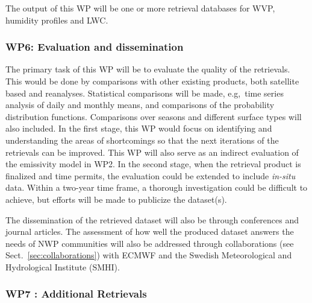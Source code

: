 \documentclass[12pt,oneside,a4paper]{article}
\begin{document}
The output of this WP will be one or more retrieval databases for WVP, humidity profiles and LWC.
\vspace{-1.0ex}
\subsubsection*{WP6: Evaluation and dissemination}
%
\label{sec:evaluation}
The primary task of this WP will be to evaluate the quality of the retrievals.  This would be done by comparisons with other existing products, both satellite based and reanalyses. Statistical comparisons will be made, e.g,\, time series analysis of daily and monthly means, and comparisons of the probability
distribution functions. Comparisons over seasons and different surface types will also included. In the first stage, this WP would focus on identifying and understanding the areas of shortcomings so that the next iterations of the retrievals can be improved. This WP will also serve as an indirect evaluation of the emissivity model in WP2. In the second stage, when the retrieval product is finalized and time permits, the evaluation could be extended to include \textit{in-situ} data. Within a two-year time frame, a thorough investigation could be difficult to achieve, but efforts will be made to publicize the dataset(s). 
 

The dissemination of the retrieved dataset will also be through conferences and journal articles. The assessment of how well the produced dataset answers the needs of NWP communities will also be addressed through collaborations (see Sect.~\ref{sec:collaborations}) with ECMWF and the Swedish Meteorological and Hydrological Institute (SMHI). 
\vspace{-1.0ex}
\subsubsection*{WP7 : Additional Retrievals}
%
\label{sec:other_retrievals}
\end{document}
